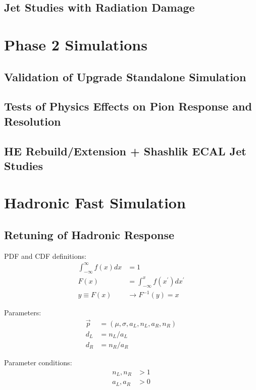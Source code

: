 \subsection{Jet Studies with Radiation Damage}

\section{Phase 2 Simulations}

\subsection{Validation of Upgrade Standalone Simulation}

\subsection{Tests of Physics Effects on Pion Response and Resolution}

\subsection{HE Rebuild/Extension + Shashlik ECAL Jet Studies}

\section{Hadronic Fast Simulation}

\subsection{Retuning of Hadronic Response}

PDF and CDF definitions:
\begin{align}
\int_{-\infty}^{\infty} f(x)dx &= 1 \\
F(x) &= \int_{-\infty}^{x} f(x^{\prime})dx^{\prime} \\
y \equiv F(x) &\rightarrow F^{-1}(y) = x
\end{align}

Parameters:
\begin{align}
\vec{p} &= (\mu,\sigma,a_{L},n_{L},a_{R},n_{R}) \\
d_{L} &= n_{L}/a_{L} \\
d_{R} &= n_{R}/a_{R}
\end{align}

Parameter conditions:
\begin{align}
n_{L}, n_{R} &> 1\\
a_{L}, a_{R} &> 0
\end{align}

